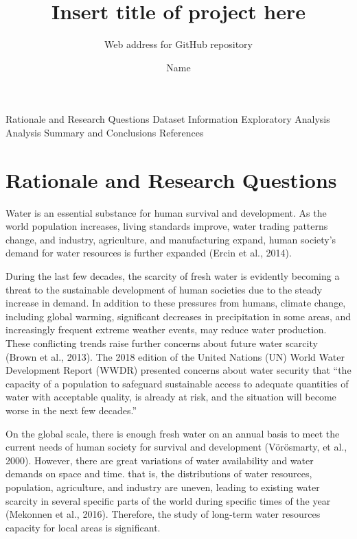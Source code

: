 \documentclass[
  12pt,
]{article}
\title{Insert title of project here}
\subtitle{Web address for GitHub repository}
\author{Name}
\date{}
\begin{document}
\maketitle

\newpage
\tableofcontents

Rationale and Research Questions Dataset Information Exploratory
Analysis Analysis Summary and Conclusions References

\newpage
\listoftables

\newpage
\listoffigures

\newpage

\hypertarget{rationale-and-research-questions}{%
\section{Rationale and Research
Questions}\label{rationale-and-research-questions}}

Water is an essential substance for human survival and development. As
the world population increases, living standards improve, water trading
patterns change, and industry, agriculture, and manufacturing expand,
human society's demand for water resources is further expanded (Ercin et
al., 2014).

During the last few decades, the scarcity of fresh water is evidently
becoming a threat to the sustainable development of human societies due
to the steady increase in demand. In addition to these pressures from
humans, climate change, including global warming, significant decreases
in precipitation in some areas, and increasingly frequent extreme
weather events, may reduce water production. These conflicting trends
raise further concerns about future water scarcity (Brown et al., 2013).
The 2018 edition of the United Nations (UN) World Water Development
Report (WWDR) presented concerns about water security that ``the
capacity of a population to safeguard sustainable access to adequate
quantities of water with acceptable quality, is already at risk, and the
situation will become worse in the next few decades.''

On the global scale, there is enough fresh water on an annual basis to
meet the current needs of human society for survival and development
(Vörösmarty, et al., 2000). However, there are great variations of water
availability and water demands on space and time. that is, the
distributions of water resources, population, agriculture, and industry
are uneven, leading to existing water scarcity in several specific parts
of the world during specific times of the year (Mekonnen et al., 2016).
Therefore, the study of long-term water resources capacity for local
areas is significant.
\end{document}
